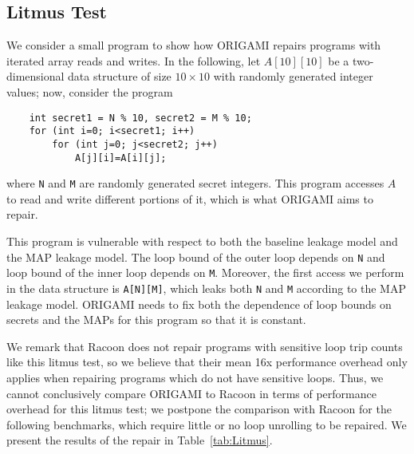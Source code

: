 \subsection{Litmus Test}
We consider a small program to show how ORIGAMI repairs programs with iterated array reads and writes. In the following, let $A[10][10]$ be a two-dimensional data structure of size $10\times10$ with randomly generated integer values; now, consider the program
{
\begin{verbatim}
    int secret1 = N % 10, secret2 = M % 10;
    for (int i=0; i<secret1; i++)
        for (int j=0; j<secret2; j++)
            A[j][i]=A[i][j];
\end{verbatim}
}
where \texttt{N} and \texttt{M} are randomly generated secret integers. This program accesses $A$ to read and write different portions of it, which is what ORIGAMI aims to repair.

This program is vulnerable with respect to both the baseline leakage model and the MAP leakage model. The loop bound of the outer loop depends on \texttt{N} and loop bound of the inner loop depends on \texttt{M}. Moreover, the first access we perform in the data structure is \texttt{A[N][M]}, which leaks both \texttt{N} and \texttt{M} according to the MAP leakage model. ORIGAMI needs to fix both the dependence of loop bounds on secrets and the MAPs for this program so that it is constant. 

We remark that Racoon does not repair programs with sensitive loop trip counts like this litmus test, so we believe that their mean 16x performance overhead only applies when repairing programs which do not have sensitive loops. Thus, we cannot conclusively compare ORIGAMI to Racoon in terms of performance overhead for this litmus test; we postpone the comparison with Racoon for the following benchmarks, which require little or no loop unrolling to be repaired. We present the results of the repair in Table~\ref{tab:Litmus}. 

